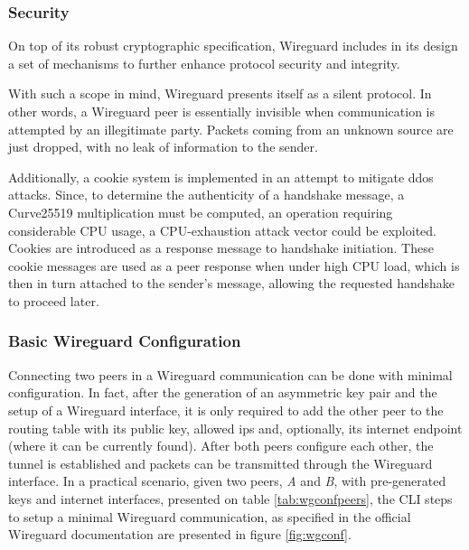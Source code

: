 \documentclass[11pt,twoside,a4paper]{report}
\begin{document}
\subsubsection{Security}

On top of its robust cryptographic specification, Wireguard includes in its design a set of mechanisms to further enhance protocol security and integrity.

With such a scope in mind, Wireguard presents itself as a silent protocol. In other words, a Wireguard peer is essentially invisible when communication is attempted by an illegitimate party. Packets coming from an unknown source are just dropped, with no leak of information to the sender.

Additionally, a cookie system is implemented in an attempt to mitigate \ac{ddos} attacks. Since, to determine the authenticity of a handshake message, a Curve25519 multiplication must be computed,  an operation requiring considerable CPU usage, a CPU-exhaustion attack vector could be exploited. Cookies are introduced as a response message to handshake initiation. These cookie messages are used as a peer response when under high CPU load, which is then in turn attached to the sender's message, allowing the requested handshake to proceed later.


\subsubsection{Basic Wireguard Configuration}

Connecting two peers in a Wireguard communication can be done with minimal configuration. In fact, after the generation of an asymmetric key pair and the setup of a Wireguard interface, it is only required to add the other peer to the routing table with its public key, allowed \ac{ip}s and, optionally, its internet endpoint (where it can be currently found). After both peers configure each other, the tunnel is established and packets can be transmitted through the Wireguard interface.
In a practical scenario, given two peers, \emph{A} and \emph{B}, with pre-generated keys and internet interfaces, presented on table \ref{tab:wgconfpeers}, the CLI steps to setup a minimal Wireguard communication, as specified in the official Wireguard documentation are presented in figure \ref{fig:wgconf}.
\end{document}
